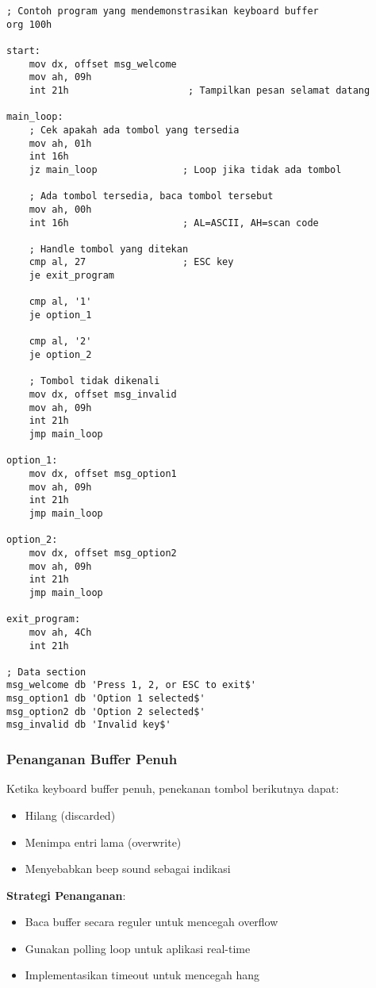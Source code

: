 \documentclass[../main.tex]{subfiles}
\begin{document}
\begin{lstlisting}[language={[x86masm]Assembler}, caption=Contoh Penggunaan Keyboard Buffer, label={lst:keyboard-buffer}]
; Contoh program yang mendemonstrasikan keyboard buffer
org 100h

start:
    mov dx, offset msg_welcome
    mov ah, 09h
    int 21h                     ; Tampilkan pesan selamat datang
    
main_loop:
    ; Cek apakah ada tombol yang tersedia
    mov ah, 01h
    int 16h
    jz main_loop               ; Loop jika tidak ada tombol
    
    ; Ada tombol tersedia, baca tombol tersebut
    mov ah, 00h
    int 16h                    ; AL=ASCII, AH=scan code
    
    ; Handle tombol yang ditekan
    cmp al, 27                 ; ESC key
    je exit_program
    
    cmp al, '1'
    je option_1
    
    cmp al, '2'
    je option_2
    
    ; Tombol tidak dikenali
    mov dx, offset msg_invalid
    mov ah, 09h
    int 21h
    jmp main_loop
    
option_1:
    mov dx, offset msg_option1
    mov ah, 09h
    int 21h
    jmp main_loop
    
option_2:
    mov dx, offset msg_option2
    mov ah, 09h
    int 21h
    jmp main_loop
    
exit_program:
    mov ah, 4Ch
    int 21h

; Data section
msg_welcome db 'Press 1, 2, or ESC to exit$'
msg_option1 db 'Option 1 selected$'
msg_option2 db 'Option 2 selected$'
msg_invalid db 'Invalid key$'
\end{lstlisting}

            \subsubsection{Penanganan Buffer Penuh}
Ketika keyboard buffer penuh, penekanan tombol berikutnya dapat:
\begin{itemize}
    \item Hilang (discarded)
    \item Menimpa entri lama (overwrite)
    \item Menyebabkan beep sound sebagai indikasi
\end{itemize}

\textbf{Strategi Penanganan}:
\begin{itemize}
    \item Baca buffer secara reguler untuk mencegah overflow
    \item Gunakan polling loop untuk aplikasi real-time
    \item Implementasikan timeout untuk mencegah hang
\end{itemize}
\end{document}

